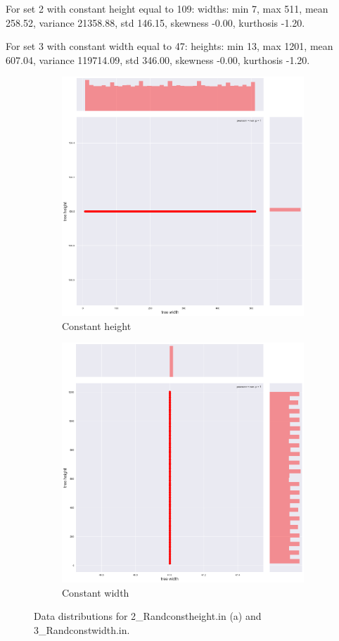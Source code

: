 For set 2 with constant height equal to 109:
widths: min 7, max 511, mean 258.52, variance 21358.88, std 146.15,
skewness -0.00, kurthosis -1.20.

For set 3 with constant width equal to 47: 
heights: min 13, max 1201, mean 607.04, variance 119714.09, std 346.00, skewness -0.00, kurthosis -1.20.

\begin{figure}[H]
\centering
\begin{subfigure}{.5\textwidth}
  \centering
  \includegraphics[width=.8\linewidth]{img/2_RANDCONSTHEIGHT_plot.png}
  \caption{Constant height}
  \label{fig:data:randconstheight}
\end{subfigure}%
\begin{subfigure}{.5\textwidth}
  \centering
  \includegraphics[width=.8\linewidth]{img/3_RANDCONSTWIDTH_plot.png}
  \caption{Constant width}
  \label{fig:data:randconstwidth}
\end{subfigure}
\caption{Data distributions for 2\_Randconstheight.in (a) and 3\_Randconstwidth.in.}
\label{fig:test}
\end{figure}

